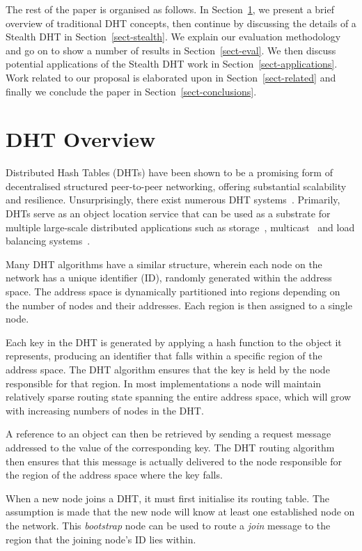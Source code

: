 \documentclass[letterpaper]{sig-alternate} %
\begin{document}
The rest of the paper is organised as follows. In
Section~\ref{sect-overview}, we present a brief overview of
traditional DHT concepts, then continue by discussing the details of
a Stealth DHT in Section~\ref{sect-stealth}. We explain our
evaluation methodology and go on to show a number of results in
Section~\ref{sect-eval}. We then discuss potential applications of
the Stealth DHT work in Section~\ref{sect-applications}. Work
related to our proposal is elaborated upon in
Section~\ref{sect-related} and finally we conclude the paper in
Section~\ref{sect-conclusions}.

\section{DHT Overview}
\label{sect-overview}

Distributed Hash Tables (DHTs) have been shown to be a promising form of
decentralised structured peer-to-peer networking, offering substantial
scalability and resilience. Unsurprisingly, there exist numerous DHT
systems~\cite{rowstron01pastry,chord01,tapestry01,can01}. Primarily, DHTs serve
as an object location service that can be used as a substrate for multiple
large-scale distributed applications such as
storage~\cite{past,dabek01,oceanstore}, multicast~\cite{scribe,bayeux} and load
balancing systems~\cite{kar04,bri05}.

Many DHT algorithms have a similar structure, wherein each node on the network
has a unique identifier (ID), randomly generated within the address space. The
address space is dynamically partitioned into regions depending on the number
of nodes and their addresses. Each region is then assigned to a single node.

Each key in the DHT is generated by applying a hash function to the
object it represents, producing an identifier that falls within a
specific region of the address space.  The DHT algorithm ensures
that the key is held by the node responsible for that region.  In
most implementations a node will maintain relatively sparse routing
state spanning the entire address space, which will grow with
increasing numbers of nodes in the DHT.

A reference to an object can then be retrieved by sending a request
message addressed to the value of the corresponding key. The DHT
routing algorithm then ensures that this message is actually
delivered to the node responsible for the region of the address
space where the key falls.

When a new node joins a DHT, it must first initialise its routing
table. The assumption is made that the new node will know at least
one established node on the network. This \emph{bootstrap} node can
be used to route a {\em join} message to the region that the joining
node's ID lies within.
\end{document}
